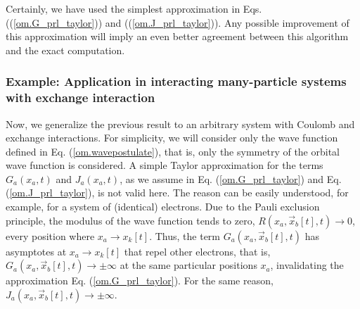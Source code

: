 \documentclass[onecolumn,nofootinbib, secnumarabic, amsmath, nobibnotes,12pt,aps,pra]{revtex4-1}
\newcommand{\pref}[1]{(\ref{#1})}
\newcommand{\eref}[1]{Eq. (\ref{#1})}
\begin{document}
Certainly, we have used the simplest approximation in Eqs. (\pref{om.G_prl_taylor}) and (\pref{om.J_prl_taylor}). Any possible improvement of this approximation will imply an even better agreement between this algorithm and the exact computation.

\subsubsection{Example: Application in interacting many-particle systems with exchange interaction}

Now, we generalize the previous result to an arbitrary system with
Coulomb and exchange interactions. For simplicity, we will consider
only the wave function defined in \eref{om.wavepostulate}, that is,
only the symmetry of the orbital wave function is considered. A
simple Taylor approximation for the terms \textit{$G_{a}(x_a,t)$}
and \textit{$J_{a}(x_a,t)$}, as we assume in \eref{om.G_prl_taylor}
and \eref{om.J_prl_taylor}, is not valid here. The reason can be
easily understood, for example, for a system of (identical)
electrons. Due to the Pauli exclusion principle, the modulus of the
wave function tends to zero, $R({{x}_{a}},{{\vec{x}}_{b}}[t],t)\to
0$, every position where ${{x}_{a}}\to {{x}_{k}}[t]$. Thus, the term
\textit{${{G}_{a}}({{x}_{a}},{{\vec{x}}_{b}}[t],t)$} has asymptotes
at ${{x}_{a}}\to {{x}_{k}}[t]$ that repel other electrons, that is,
${G}_{a}({{x}_{a}},{{\vec{x}}_{b}}[t],t) \to \pm \infty $ at the
same particular positions $x_a$, invalidating the approximation
\eref{om.G_prl_taylor}. For the same reason,
${J}_{a}({{x}_{a}},{{\vec{x}}_{b}}[t],t) \to \pm \infty $.
\end{document}
